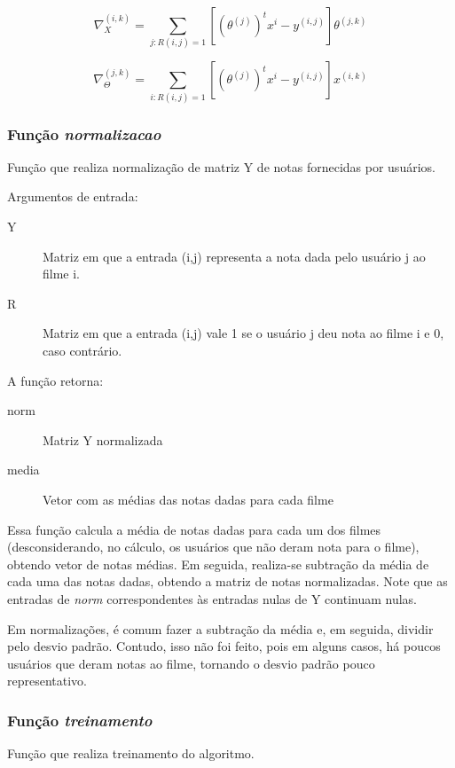 \documentclass[12pt]{article}
\begin{document}
\begin{equation} \label{eq_grad_x}
\nabla_X^{(i,k)} = \sum_{j:R(i,j)=1} \left[\left(\theta^{(j)}\right)^t x^i - y^{(i,j)}\right]\theta^{(j,k)}
\end{equation}

\begin{equation} \label{eq_grad_theta}
\nabla_{\Theta}^{(j,k)} = \sum_{i:R(i,j)=1} \left[\left(\theta^{(j)}\right)^t x^i - y^{(i,j)}\right]x^{(i,k)}
\end{equation}

\subsubsection{Função \textit{normalizacao}}
Função que realiza normalização de matriz Y de notas fornecidas por usuários.

Argumentos de entrada:

\begin{description}
\item[Y] Matriz em que a entrada (i,j) representa a nota dada pelo usuário j ao filme i.
\item[R] Matriz em que a entrada (i,j) vale 1 se o usuário j deu nota ao filme i e 0, caso contrário.
\end{description}

A função retorna:

\begin{description}
\item[norm] Matriz Y normalizada
\item[media] Vetor com as médias das notas dadas para cada filme
\end{description}

Essa função calcula a média de notas dadas para cada um dos filmes (desconsiderando, no cálculo, os usuários que não deram nota para o filme), obtendo vetor de notas médias. Em seguida, realiza-se subtração da média de cada uma das notas dadas, obtendo a matriz de notas normalizadas. Note que as entradas de \textit{norm} correspondentes às entradas nulas de Y continuam nulas.

Em normalizações, é comum fazer a subtração da média e, em seguida, dividir pelo desvio padrão. Contudo, isso não foi feito, pois em alguns casos, há poucos usuários que deram notas ao filme, tornando o desvio padrão pouco representativo.

\subsubsection{Função \textit{treinamento}}
Função que realiza treinamento do algoritmo.
\end{document}

